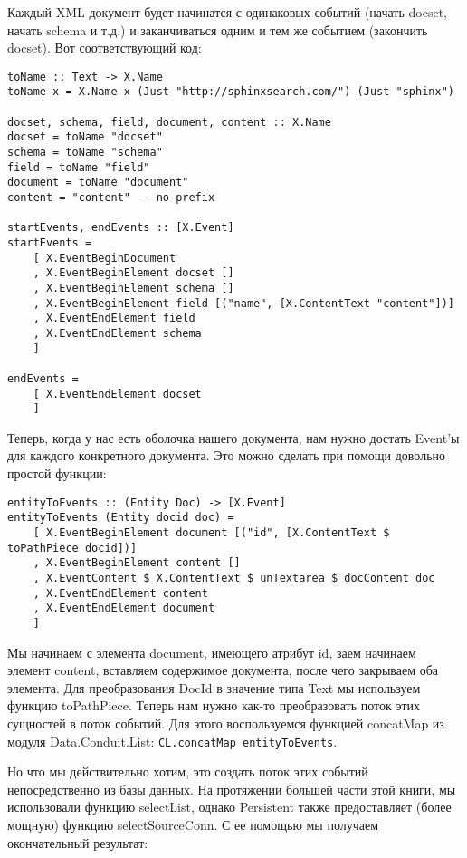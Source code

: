 Каждый XML-документ будет начинатся с одинаковых событий (начать docset, начать schema и т.д.) и заканчиваться одним и тем же событием (закончить docset). Вот соответствующий код: %

\begin{lstlisting}
toName :: Text -> X.Name
toName x = X.Name x (Just "http://sphinxsearch.com/") (Just "sphinx")

docset, schema, field, document, content :: X.Name
docset = toName "docset"
schema = toName "schema"
field = toName "field"
document = toName "document"
content = "content" -- no prefix

startEvents, endEvents :: [X.Event]
startEvents =
    [ X.EventBeginDocument
    , X.EventBeginElement docset []
    , X.EventBeginElement schema []
    , X.EventBeginElement field [("name", [X.ContentText "content"])]
    , X.EventEndElement field
    , X.EventEndElement schema
    ]

endEvents =
    [ X.EventEndElement docset
    ]
\end{lstlisting}

Теперь, когда у нас есть оболочка нашего документа, нам нужно достать Event'ы для каждого конкретного документа. Это можно сделать при помощи довольно простой функции:

\begin{lstlisting}
entityToEvents :: (Entity Doc) -> [X.Event]
entityToEvents (Entity docid doc) =
    [ X.EventBeginElement document [("id", [X.ContentText $ toPathPiece docid])]
    , X.EventBeginElement content []
    , X.EventContent $ X.ContentText $ unTextarea $ docContent doc
    , X.EventEndElement content
    , X.EventEndElement document
    ]
\end{lstlisting}

Мы начинаем с элемента document, имеющего атрибут id, заем начинаем элемент content, вставляем содержимое документа, после чего закрываем оба элемента. Для преобразования DocId в значение типа Text мы используем функцию toPathPiece. Теперь нам нужно как-то преобразовать поток этих сущностей в поток событий. Для этого воспользуемся функцией concatMap из модуля Data.Conduit.List: \lstinline`CL.concatMap entityToEvents`.

Но что мы действительно хотим, это создать поток этих событий непосредственно из базы данных. На протяжении большей части этой книги, мы использовали функцию selectList, однако Persistent также предоставляет (более мощную) функцию selectSourceConn. С ее помощью мы получаем окончательный результат: %

